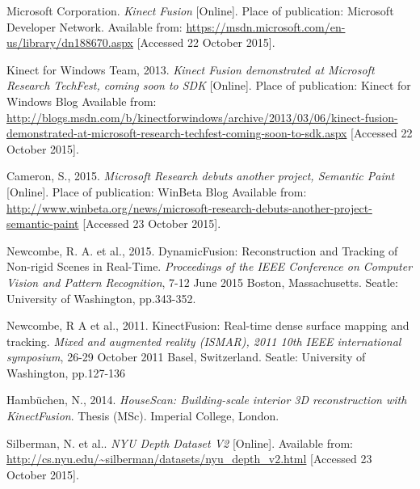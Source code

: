 \documentclass[11pt,openright,a4paper]{report}
\begin{document}
\begin{thebibliography}{7}
    Microsoft Corporation.
    \textit{Kinect Fusion} [Online]. 
    Place of publication: Microsoft Developer Network.
    Available from: \url{https://msdn.microsoft.com/en-us/library/dn188670.aspx}
    [Accessed 22 October 2015].

    Kinect for Windows Team, 2013.
    \textit{Kinect Fusion demonstrated at Microsoft Research TechFest, coming soon to SDK} [Online].
    Place of publication: Kinect for Windows Blog
    Available from: \url{http://blogs.msdn.com/b/kinectforwindows/archive/2013/03/06/kinect-fusion-demonstrated-at-microsoft-research-techfest-coming-soon-to-sdk.aspx}
    [Accessed 22 October 2015].

    Cameron, S., 2015.
    \textit{Microsoft Research debuts another project, Semantic Paint} [Online].
    Place of publication: WinBeta Blog
    Available from: \url{http://www.winbeta.org/news/microsoft-research-debuts-another-project-semantic-paint}
    [Accessed 23 October 2015].

    Newcombe, R. A. et al., 2015.
    DynamicFusion: Reconstruction and Tracking of Non-rigid Scenes in Real-Time. 
    \textit{Proceedings of the IEEE Conference on Computer Vision and Pattern Recognition}, 7-12 June 2015 Boston, Massachusetts.
    Seatle: University of Washington, pp.343-352.

    Newcombe, R A et al., 2011.
    KinectFusion: Real-time dense surface mapping and tracking.
    \textit{Mixed and augmented reality (ISMAR), 2011 10th IEEE international symposium}, 26-29 October 2011 Basel, Switzerland.
    Seatle: University of Washington, pp.127-136

    Hambüchen, N., 2014.
    \textit{HouseScan: Building-scale interior 3D reconstruction with KinectFusion}. 
    Thesis (MSc).
    Imperial College, London.

  \bibitem{}
    Silberman, N. et al..
    \textit{NYU Depth Dataset V2} [Online].
    Available from: \url{http://cs.nyu.edu/~silberman/datasets/nyu_depth_v2.html}
    [Accessed 23 October 2015].

\end{thebibliography}
\newpage
\end{document}
